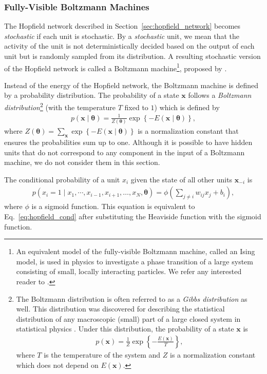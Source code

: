 \documentclass{now}
\newcommand{\vect}[1]{\mathbf{#1}}
\newcommand{\vects}[1]{\boldsymbol{#1}}
\newcommand{\vx}[0]{\vect{x}}
\newcommand{\TT}[0]{{\vects{\theta}}}
\begin{document}
\subsubsection{Fully-Visible Boltzmann Machines}
\label{sec:fvbm}

The Hopfield network described in
Section~\ref{sec:hopfield_network} becomes
\textit{stochastic} if each unit is stochastic.
By a \textit{stochastic} unit, we mean that the activity of
the unit is not deterministically decided based on the
output of each unit but is randomly sampled from its
distribution.  A resulting stochastic version of the Hopfield
network is called a Boltzmann machine\footnote{ An
equivalent model of the fully-visible Boltzmann machine,
called an Ising model, is used in physics to investigate a
phase transition of a large system consisting of small,
locally interacting particles. We refer any interested
reader to \citep[][and references therein]{Cipra1987}.},
proposed by \citet{Ackley1985}. 

Instead of the energy of the Hopfield network, the Boltzmann
machine is defined by a probability distribution. The
probability of a state $\vx$ follows a \textit{Boltzmann
distribution}\footnote{The Boltzmann distribution is often
referred to as a \textit{Gibbs distribution} as well. This
distribution was discovered for describing the statistical
distribution of any macroscopic (small) part of a large
closed system in statistical physics \citep[see,
e.g.,][]{Landau1980}. Under this distribution, the
probability of a state $\vx$ is
\begin{align*}
    p(\vx) = \frac{1}{Z} \exp\left\{ -\frac{E(\vx)}{T}
    \right\},
\end{align*}
where $T$ is the temperature of the system and $Z$ is a
normalization constant which does not depend on $E(\vx)$.
}
(with the temperature $T$ fixed to $1$) which is
defined by
\begin{align}
    \label{eq:bm}
    p(\vx \mid \TT) = \frac{1}{Z(\TT)} \exp \left\{
    -E\left(\vx \mid \TT \right)\right\},
\end{align}
where $Z(\TT)=\sum_{\vx} \exp\left\{ -E(\vx \mid \TT)
\right\}$ is a normalization constant that ensures the
probabilities sum up to one. Although it is possible to have
hidden units that do not correspond to any component in the
input of a Boltzmann machine, we do not consider them in this
section.

The conditional probability of a unit $x_i$ given the state
of all other units $\vx_{-i}$ is
\begin{align}
    \label{eq:bm_cond}
    p(x_i = 1 \mid x_1, \cdots, x_{i-1}, x_{i+1}, \dots ,x_N,
    \TT) = \phi\left( \sum_{j \neq i} w_{ij} x_j + b_i
    \right),
\end{align}
where $\phi$ is a sigmoid function. This equation is equivalent
to Eq.~\eqref{eq:hopfield_cond} after substituting the Heaviside
function with the sigmoid function. 
\end{document}
